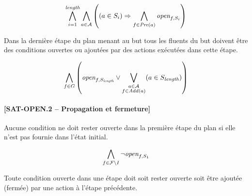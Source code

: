 
\begin{small}
\[
\bigwedge\limits_{\substack{i=1}}^{\textit{length}}\bigwedge\limits_{\substack{\substack{a\in \mathcal{A}}}}\left((a \in S_{i}) \Rightarrow \bigwedge\limits_{\substack{\substack{f\in \mathit{Pre}(a)}}}\textit{open}_{f,S_{i}}\right)
\]
\end{small}

Dans la dernière étape du plan menant au but tous les fluents du but doivent être des conditions ouvertes ou ajoutées par des actions exécutées dans cette étape.


\begin{small}
\[
\bigwedge\limits_{\substack{\substack{f\in G}}}\left(\textit{open}_{f,S_{\textit{length}}} \vee \bigvee\limits_{\substack{\substack{a\in \mathcal{A}\\f \in \mathit{Add}(a)}}}(a \in S_{\textit{length}})\right)
\]
\end{small}

\paragraph*{[SAT-OPEN.2 -- Propagation et fermeture]}

Aucune condition ne doit rester ouverte dans la première étape du plan si elle n'est pas fournie dans l'état initial.


\begin{small}
\[
\bigwedge\limits_{\substack{\substack{f\in \mathcal{F}\setminus I}}}\neg \textit{open}_{f,S_{1}}
\]
\end{small}

Toute condition ouverte dans une étape doit soit rester ouverte soit être ajoutée (fermée) par une action à l'étape précédente.


